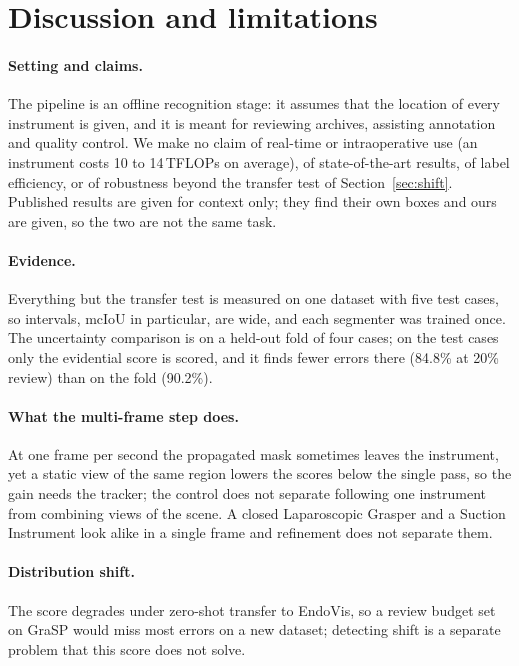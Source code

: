 \section{Discussion and limitations}
\label{sec:limits}

\paragraph{Setting and claims.}
The pipeline is an offline recognition stage: it assumes that the location of every instrument is given, and it is meant for reviewing archives, assisting annotation and quality control.
We make no claim of real-time or intraoperative use (an instrument costs 10 to 14\,TFLOPs on average), of state-of-the-art results, of label efficiency, or of robustness beyond the transfer test of Section~\ref{sec:shift}.
Published results are given for context only; they find their own boxes and ours are given, so the two are not the same task.

\paragraph{Evidence.}
Everything but the transfer test is measured on one dataset with five test cases, so intervals, mcIoU in particular, are wide, and each segmenter was trained once.
The uncertainty comparison is on a held-out fold of four cases; on the test cases only the evidential score is scored, and it finds fewer errors there (84.8\% at 20\% review) than on the fold (90.2\%).

\paragraph{What the multi-frame step does.}
At one frame per second the propagated mask sometimes leaves the instrument, yet a static view of the same region lowers the scores below the single pass, so the gain needs the tracker; the control does not separate following one instrument from combining views of the scene.
A closed Laparoscopic Grasper and a Suction Instrument look alike in a single frame and refinement does not separate them.

\paragraph{Distribution shift.}
The score degrades under zero-shot transfer to EndoVis, so a review budget set on GraSP would miss most errors on a new dataset; detecting shift is a separate problem that this score does not solve.

